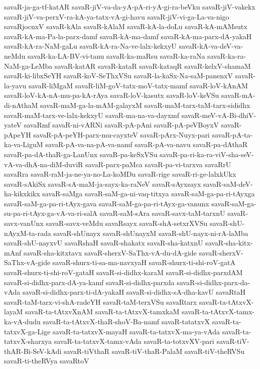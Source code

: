 {savaR-ja-ga-tf-katAR
savaR-jiV-va-da-yA-pA-ri-yA-gi-ra-beVku
savaR-jiV-vakekx
savaR-jiV-va-perxV-ra-kA-ya-tatx-vA-gi-havu
savaR-jiV-vi-ga-La-va-nigo
savaRjocnxV
savaR-kAla
savaR-kAlaM
savaR-kA-la-doLu
savaR-kA-mAMsutx
savaR-kA-ma-Pa-la-parx-damf
savaR-kA-ma-damf
savaR-kA-ma-parx-dA-yakaH
savaR-kA-ra-NaM-gaLu
savaR-kA-ra-Na-ve-lalx-kekxyU
savaR-kA-va-deV-va-neMdu
savaR-ka-LA-BV-vi-tanu
savaR-ka-maRsu
savaR-ka-raNa
savaR-ka-ra-NaM-ga-LeMba
savaR-katAR
savaR-kataR
savaR-kataqR
savaR-kelxV-shamaM
savaR-ki-libxSeYH
savaR-koV-SeThxVSu
savaR-la-kaSx-Na-saM-panenxV
savaR-la-yavu
savaR-liMgaM
savaR-liM-goV-tatx-moV-tatx-mamf
savaR-loV-kAnAM
savaR-loV-kA-nA-mu-pa-kA-rAya
savaR-loV-kasutx
savaR-loV-keVSu
savaR-mA-di-nAthaM
savaR-maM-ga-la-mAM-galayxM
savaR-maM-tarx-taM-tarx-sididhx
savaR-maM-tarx-ve-lalx-kekxyU
savaR-ma-na-va-dayxmf
savaR-meV-vA-Bi-dhiV-yateV
savaRmf
savaR-ni-vARNi
savaR-pA-pAni
savaR-pA-peVBoyxV
savaR-pApeYH
savaR-pA-peYH-parx-mu-cayxteV
savaR-pArx-Nuyx-pari
savaR-pA-ta-ka-va-LiguM
savaR-pA-va-na-pA-va-namf
savaR-pA-va-navu
savaR-pa-dAthaR
savaR-pa-dA-thaR-ga-LanUnx
savaR-pa-keSxVSu
savaR-pa-ri-ka-ra-viV-sha-seV-vA-va-dhA-na-diM-duviR
savaR-parx-paMca
savaR-pa-vi-tarxva
savaRrU
savaRra
savaR-raM-ja-ne-ya-no-La-koMDu
savaR-rige
savaR-ri-ge-lalxkUkx
savaR-sAkiSx
savaR-sA-maM-ja-sayx-ka-raNeV
savaR-sAyxsayx
savaR-saM-deV-ha-kikxkikx
savaR-saMga
savaR-saM-ga-ni-vaq-titxya
savaR-saM-ga-pa-ri-tAyxga
savaR-saM-ga-pa-ri-tAyx-gava
savaR-saM-ga-pa-ri-tAyx-ga-vanunx
savaR-saM-ga-su-pa-ri-tAyx-ga-vA-va-ri-salA
savaR-saM-sAra
savaR-savx-taM-tarxnU
savaR-savx-vanUnx
savaR-savx-veMdu
savaRsayx
savaR-shA-setxrXVSu
savaR-shU-nAyxM-ta-rada
savaR-shUnayx
savaR-shUnayxM
savaR-shU-nayx-ni-rA-laMba
savaR-shU-nayxvU
savaRshaH
savaR-shakatx
savaR-sha-katxnU
savaR-sha-kitx-mAnf
savaR-sha-kitxtavx
savaR-sherxV-SaThx-vA-du-dA-gide
savaR-sherxV-SaThx-vA-gide
savaR-shurx-ti-sa-ma-navxyaH
savaR-shurx-ti-shi-roV-gatA
savaR-shurx-ti-shi-roV-gataH
savaR-si-didhx-karaM
savaR-si-didhx-parxdAM
savaR-si-didhx-parx-dA-ya-kamf
savaR-si-didhx-parxda
savaR-si-didhx-parx-da-vAda
savaR-si-didhx-parx-ti-dA-yakaH
savaR-si-didhx-sA-dha-kavU
savaRtaH
savaR-taM-tarx-vi-shA-radeYH
savaR-taM-terxVSu
savaRtarx
savaR-ta-tAtxvX-layaM
savaR-ta-tAtxvXnAM
savaR-ta-tAtxvX-tamxkaM
savaR-ta-tAtxvX-tamx-ka-vA-dudu
savaR-ta-tAtxvX-thaR-shoV-Ba-namf
savaR-tatatxvX
savaR-ta-tatxvX-ga-Lige
savaR-ta-tatxvX-mayaH
savaR-ta-tatxvX-ma-ya-vAda
savaR-ta-tatxvX-sharxya
savaR-ta-tatxvX-tamx-vAda
savaR-ta-totxvXV-pari
savaR-tiV-thAR-Bi-SeV-kAdi
savaR-tiVthaR
savaR-tiV-thaR-PalaM
savaR-tiV-theRVSu
savaR-ti-theRVya
savaRtoV
}

